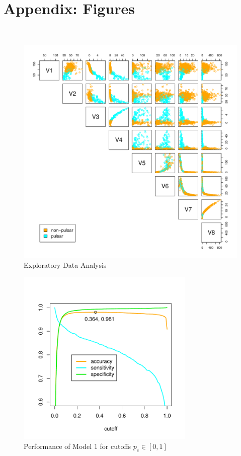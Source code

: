 \documentclass[11pt, oneside]{article}
\begin{document}
{\section*{Appendix: Figures}

~\\
\centering
\begin{figure}[h!]
\includegraphics[width = 12cm]{scattermatrix}
\caption{Exploratory Data Analysis}
\label{fig:scatter}
\end{figure}
}
\begin{figure}[h!]
\includegraphics[width = 8.5cm]{cutoffs}
\caption{Performance of Model 1 for cutoffs $p_c \in [0,1]$}
\label{fig:cutoffs}
\end{figure}
\end{document}
